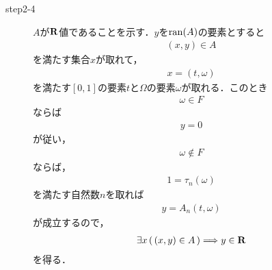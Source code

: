 \begin{sketch}
\begin{description}
			\item[step2-4]
				$A$が$\mathbf{R}$値であることを示す．$y$を$\operatorname*{ran} (A)$の要素とすると
				\begin{align}
					(x,y) \in A
				\end{align}
				を満たす集合$x$が取れて，
				\begin{align}
					x = (t,\omega)
				\end{align}
				を満たす$[0,1]$の要素$t$と$\Omega$の要素$\omega$が取れる．このとき
				\begin{align}
					\omega \in F
				\end{align}
				ならば
				\begin{align}
					y = 0
				\end{align}
				が従い，
				\begin{align}
					\omega \notin F
				\end{align}
				ならば，
				\begin{align}
					1 = \tau_{n}(\omega)
				\end{align}
				を満たす自然数$n$を取れば
				\begin{align}
					y = A_{n}(t,\omega)
				\end{align}
				が成立するので，
				\begin{align}
					\exists x\, (\, (x,y) \in A\, ) \Longrightarrow y \in \mathbf{R}
				\end{align}
				を得る．
				\QED
		\end{description}
	\end{sketch}
	